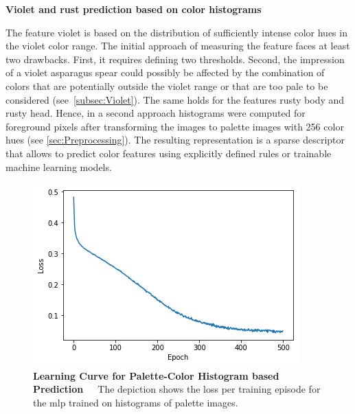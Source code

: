 \bigskip
\textbf{Violet and rust prediction based on color histograms} 

The feature violet is based on the distribution of sufficiently intense color hues in the violet color range. The initial approach of measuring the feature faces at least two drawbacks. First, it requires defining two thresholds. Second, the impression of a violet asparagus spear could possibly be affected by the combination of colors that are potentially outside the violet range or that are too pale to be considered (see~\autoref{subsec:Violet}). The same holds for the features rusty body and rusty head. Hence, in a second approach histograms were computed for foreground pixels after transforming the images to palette images with 256 color hues (see \autoref{sec:Preprocessing}). The resulting representation is a sparse descriptor that allows to predict color features using explicitly defined rules or trainable machine learning models. 

\begin{table}[!h]
	\centering
	\caption[Feature Engineering Color-Histogram-Based Prediction]{\textbf{Feature Engineering Color-Histogram-Based Prediction}~~~Performance of color histogram-based predictions with a \acrshort{mlp}.}
	\label{tab:performance_color_feature_based}
\end{table} 

\begin{figure}[!htb]
	\centering
	\includegraphics[scale=0.7]{Figures/chapter04/fe_palette_color.png}
	\decoRule
	\caption[Feature Engineering Learning Curve for Palette-Color Histogram based Prediction]{\textbf{Learning Curve for Palette-Color Histogram based Prediction}~~~The depiction shows the loss per training episode for the \acrshort{mlp} trained on histograms of palette images.}
	\label{fig:FeatureEngineeringPaletteColor}
\end{figure}


